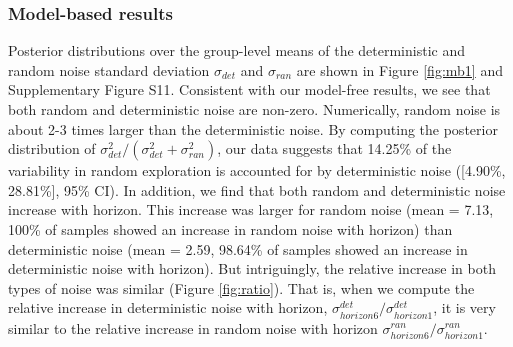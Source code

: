 \documentclass[12pt]{article}
\begin{document}
{\subsubsection*{Model-based results} 
Posterior distributions over the group-level means of the deterministic and random noise standard deviation $\sigma_{det}$ and $\sigma_{ran}$ are shown in Figure \ref{fig:mb1} and Supplementary Figure S11. Consistent with our model-free results, we see that both random and deterministic noise are non-zero. Numerically, random noise is about 2-3 times larger than the deterministic noise. By computing the posterior distribution of $\sigma^2_{det}/(\sigma^2_{det}+\sigma^2_{ran})$, our data suggests that 14.25\% of the variability in random exploration is accounted for by deterministic noise ([4.90\%, 28.81\%], 95\% CI). In addition, we find that both random and deterministic noise increase with horizon. This increase was larger for random noise (mean = 7.13, 100\% of samples showed an increase in random noise with horizon) than deterministic noise (mean = 2.59, 98.64\% of samples showed an increase in deterministic noise with horizon). But intriguingly, the relative increase in both types of noise was similar (Figure \ref{fig:ratio}). That is, when we compute the relative increase in deterministic noise with horizon, $\sigma^{det}_{horizon6}/\sigma^{det}_{horizon1}$, it is very similar to the relative increase in random noise with horizon $\sigma^{ran}_{horizon6}/\sigma^{ran}_{horizon1}$. 




}
\end{document}
